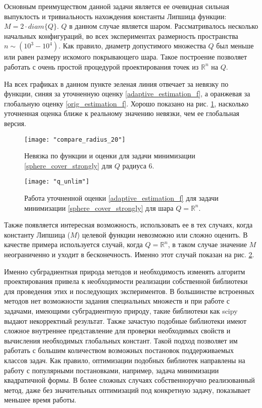 Основным преимуществом данной задачи является ее очевидная сильная выпуклость и тривиальность нахождения константы Липшица функции: $ M = 2 \cdot diam\{Q\} $. $Q$ в данном случае является шаром.
Рассматривалось несколько начальных конфигураций, во всех экспериментах размерность пространства $n \sim (10^3 - 10^4)$. Как правило, диаметр допустимого множества $Q$ был меньше или равен размеру искомого покрывающего шара. Такое построение позволяет работать с очень простой процедурой проектирования точек из $\mathbb{R}^n$ на $Q$.

На всех графиках в данном пункте зеленая линия отвечает за невязку по функции, синяя за уточненную оценку \eqref{adaptive_estimation_f}, а оранжевая за глобальную оценку \eqref{orig_estimation_f}. Хорошо показано на рис. \ref{r_20_q_6}, насколько уточненная оценка ближе к реальному значению невязки, чем ее глобальная версия. 

\begin{figure}[h]
	\centering
	\texttt{[image: "compare\_radius\_20"]}
    \caption{Невязка по функции и оценки для задачи минимизации \eqref{sphere_cover_strongly} для $Q$ радиуса 6.}
    \label{r_20_q_6}
\end{figure}

\begin{figure}[h]
	\centering
	\texttt{[image: "q\_unlim"]}
    \caption{Работа уточненной оценки \eqref{adaptive_estimation_f} для задачи минимизации \eqref{sphere_cover_strongly} для шара $Q = \mathbb{R}^n$.}
    \label{q_unlim}
\end{figure}

Также появляется интересная возможность, использовать ее в тех случаях, когда константу Липшица ($M$) целевой функции невозможно или сложно оценить. В качестве примера используется случай, когда $Q = \mathbb{R}^n$, в таком случае значение $M$ неограниченно и уходит в бесконечность. Именно этот случай показан на рис. \ref{q_unlim}. 

Именно субградиентная природа методов и необходимость изменять алгоритм проектирования привела к необходимости реализации собственной библиотеки для проведения этих и последующих экспериментов. В большинстве встроенных методов нет возможности задания специальных  множеств и при работе с задачами, имеющими субградиентную природу, такие библиотеки как scipy выдают некорректный результат. Также зачастую подобные библиотеки имеют сложное внутреннее представление для проверки необходимых свойств и вычисления необходимых глобальных констант. Такой подход позволяет им работать с большим количеством возможных постановок поддерживаемых классов задач. Как правило, оптимизации подобных библиотек направлены на работу с популярными постановками, например, задача минимизации квадратичной формы. В более сложных случаях собственноручно реализованный метод, даже без значительных оптимизаций под конкретную задачу, показывает меньшее время работы. 


